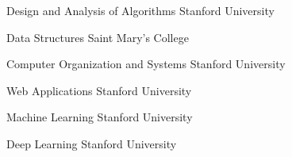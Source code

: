
\vspace{8pt}

\begin{cventries}

  \cvcourse
    {Design and Analysis of Algorithms}
    {Stanford University}
    
  \vspace{-13pt}
  \cvcourse
    {Data Structures}
    {Saint Mary's College}
    
  \vspace{-13pt}
  \cvcourse
    {Computer Organization and Systems}
    {Stanford University}
    
  \vspace{-12.5pt}
  \cvcourse
    {Web Applications}
    {Stanford University}

  \vspace{-13pt}
  \cvcourse
    {Machine Learning}
    {Stanford University}

  \vspace{-13pt}
  \cvcourse
    {Deep Learning}
    {Stanford University}
    
\end{cventries}